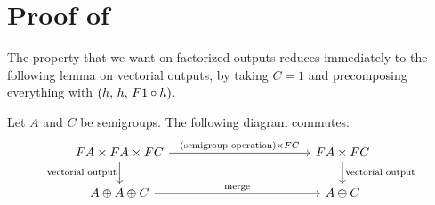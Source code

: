 \section{Proof of }

The property that we want on factorized outputs reduces immediately to the following lemma on vectorial outputs, by taking $C = 1$ and precomposing everything with $(h,\, h,\, \functor1 \circ h)$.

\begin{lemma}\label{lem:merge-middle}
    Let $A$ and $C$ be semigroups. The following diagram commutes:
    \[\begin{tikzcd}
        [column sep=4cm]
        \functor A\times \functor A \times \functor C
        \ar[d,"\text{vectorial output}"']
        \ar[r,"(\text{semigroup operation}) \times \functor C"]
        &
        \functor A \times \functor C
        \ar[d,"\text{vectorial output}"]
        \\
        A \oplus A \oplus C
        \ar[r,"\text{merge}"]
        &
        A \oplus C
    \end{tikzcd}\]
\end{lemma}

